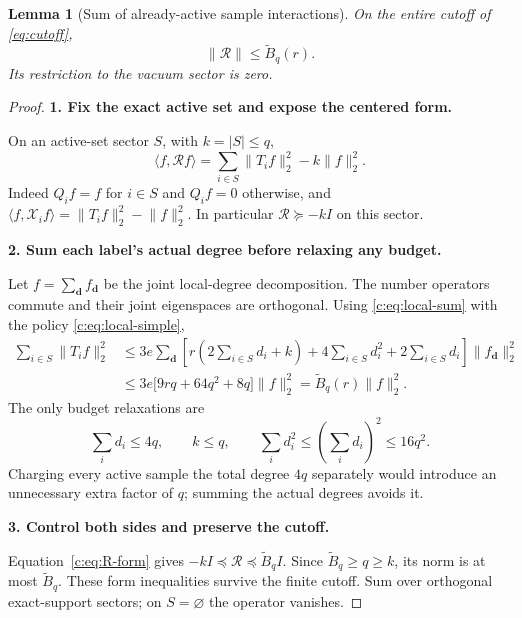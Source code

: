\documentclass[11pt]{article}
\numberwithin{equation}{section}
\newtheorem{lemma}[theorem]{Lemma}
\theoremstyle{definition}\newtheorem{definition}[theorem]{Definition}
\theoremstyle{remark}\newtheorem{remark}[theorem]{Remark}
\newcommand{\norm}[1]{\lVert#1\rVert}\newcommand{\ip}[2]{\langle#1,#2\rangle}
\newcommand{\step}[1]{\par\addvspace{.65\baselineskip}\Needspace{4\baselineskip}\noindent\textbf{#1}\par\nobreak\smallskip}
\begin{document}
\begin{lemma}[Sum of already-active sample interactions]\label{c:lem:repeated}
On the entire cutoff of \eqref{eq:cutoff},
\begin{equation}\label{c:eq:repeated}
 \norm{\mathcal R}\le\widetilde B_q(r).
\end{equation}
Its restriction to the vacuum sector is zero.
\end{lemma}
\begin{proof}
\step{1. Fix the exact active set and expose the centered form.}
On an active-set sector $S$, with $k=|S|\le q$,
\begin{equation}\label{c:eq:R-form}
 \ip f{\mathcal Rf}=\sum_{i\in S}\norm{T_if}_2^2-k\norm f_2^2.
\end{equation}
Indeed $Q_if=f$ for $i\in S$ and $Q_if=0$ otherwise, and
$\ip f{\mathcal X_if}=\norm{T_if}_2^2-\norm f_2^2$.
In particular $\mathcal R\succeq-kI$ on this sector.

\step{2. Sum each label's actual degree before relaxing any budget.}
Let $f=\sum_{\mathbf d}f_{\mathbf d}$ be the joint local-degree decomposition.
The number operators commute and their joint eigenspaces are orthogonal.
Using \eqref{c:eq:local-sum} with the policy \eqref{c:eq:local-simple},
\begin{align*}
 \sum_{i\in S}\norm{T_if}_2^2
 &\le3e\sum_{\mathbf d}
 \left[r\left(2\sum_{i\in S}d_i+k\right)
       +4\sum_{i\in S}d_i^2+2\sum_{i\in S}d_i\right]
       \norm{f_{\mathbf d}}_2^2\\
 &\le3e\bigl[9rq+64q^2+8q\bigr]\norm f_2^2
 =\widetilde B_q(r)\norm f_2^2.
\end{align*}
The only budget relaxations are
\[
 \sum_i d_i\le4q,\qquad k\le q,\qquad
 \sum_i d_i^2\le\left(\sum_i d_i\right)^2\le16q^2.
\]
Charging every active sample the total degree $4q$ separately would introduce
an unnecessary extra factor of $q$; summing the actual degrees avoids it.

\step{3. Control both sides and preserve the cutoff.}
Equation~\eqref{c:eq:R-form} gives
$-kI\preceq\mathcal R\preceq\widetilde B_q I$.
Since $\widetilde B_q\ge q\ge k$, its norm is at most $\widetilde B_q$.
These form inequalities survive the finite cutoff. Sum over orthogonal
exact-support sectors; on $S=\varnothing$ the operator vanishes.
\end{proof}
\end{document}
